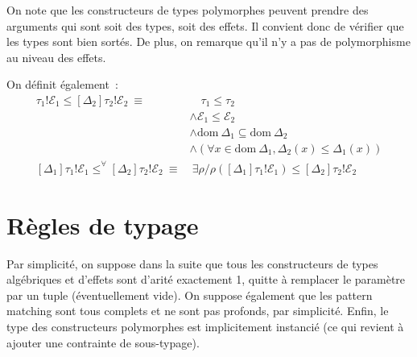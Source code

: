 \documentclass[a4paper,10pt]{article}
\begin{document}
On note que les constructeurs de types polymorphes peuvent prendre des arguments qui sont soit des types, soit des effets. Il convient donc de vérifier que les types sont bien sortés. De plus, on remarque qu'il n'y a pas de polymorphisme au niveau des effets.

On définit également~:
\begin{align*}
[\Delta_1]\tau_1!\mathcal{E}_1 \leqslant [\Delta_2]\tau_2!\mathcal{E}_2 ~\equiv&\quad \tau_1 \leqslant \tau_2 \\&\wedge \mathcal{E}_1 \leqslant \mathcal{E}_2 \\&\wedge \mathrm{dom}~\Delta_1 \subseteq \mathrm{dom}~\Delta_2 \\&\wedge (\forall x \in \mathrm{dom}~\Delta_1, \Delta_2(x) \leqslant \Delta_1(x)) \\
[\Delta_1]\tau_1!\mathcal{E}_1 \leqslant^\forall [\Delta_2]\tau_2!\mathcal{E}_2~\equiv&~\exists \rho / \rho([\Delta_1]\tau_1!\mathcal{E}_1) \leqslant [\Delta_2]\tau_2!\mathcal{E}_2
\end{align*}

\section{Règles de typage}

Par simplicité, on suppose dans la suite que tous les constructeurs de types algébriques et d'effets sont d'arité exactement 1, quitte à remplacer le paramètre par un tuple (éventuellement vide). On suppose également que les pattern matching sont tous complets et ne sont pas profonds, par simplicité. Enfin, le type des constructeurs polymorphes est implicitement instancié (ce qui revient à ajouter une contrainte de sous-typage).

\renewcommand{\DefTirName}{\LeftTirName}
\end{document}
